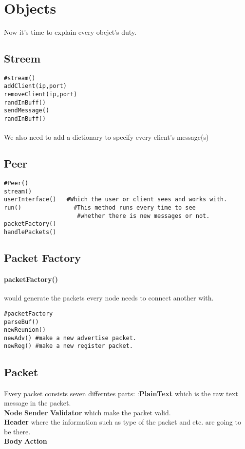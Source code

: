 \documentclass{article}
\begin{document}
\section{Objects}
\paragraph{}Now it's time to explain every obejct's duty.
\subsection{Streem}
\begin{lstlisting}
#stream()
addClient(ip,port)
removeClient(ip,port)
randInBuff()
sendMessage()
randInBuff()
\end{lstlisting}
\paragraph{}We also need to add a dictionary to specify every client's message(s)
\subsection{Peer}
\begin{lstlisting}
#Peer()
stream()
userInterface()   #Which the user or client sees and works with. 
run() 				#This method runs every time to see 
				     #whether there is new messages or not.
packetFactory()
handlePackets()
\end{lstlisting}
\subsection{Packet Factory}
\paragraph{packetFactory()} would generate the packets every node needs to connect another with.
\begin{lstlisting}
#packetFactory
parseBuf()
newReunion()
newAdv() #make a new advertise packet.
newReg() #make a new register packet.
\end{lstlisting}
\subsection{Packet}
\paragraph{}Every packet consists seven differntes parts: :\textbf{PlainText} which is the raw text message in the packet.\\
 \textbf{Node} \textbf{Sender} \textbf{Validator} which make the packet valid.\\ \textbf{Header} where the information such as type of the packet and etc. are going to be there.\\ \textbf{Body}  \textbf{Action}
\end{document}
